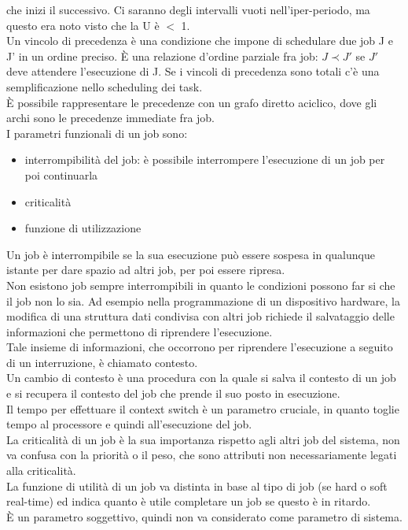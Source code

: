 \documentclass[12pt, oneside]{extbook}
\begin{document}
che inizi il successivo. Ci saranno degli intervalli vuoti nell'iper-periodo, ma questo era noto visto che la U è $<$ 1.\\ Un vincolo di precedenza è una condizione che impone di schedulare due job J e J' in un ordine preciso. È una relazione d'ordine parziale fra job: $J \prec J'$ se $J'$ deve attendere l'esecuzione di J. Se i vincoli di precedenza sono totali c'è una semplificazione nello scheduling dei task.\\ È possibile rappresentare le precedenze con un grafo diretto aciclico, dove gli archi sono le precedenze immediate fra job.\\ I parametri funzionali di un job sono:
\begin{itemize}
\item interrompibilità del job: è possibile interrompere l'esecuzione di un job per poi continuarla
\item criticalità
\item funzione di utilizzazione
\end{itemize}
Un job è interrompibile se la sua esecuzione può essere sospesa in qualunque istante per dare spazio ad altri job, per poi essere ripresa.\\ Non esistono job sempre interrompibili in quanto le condizioni possono far si che il job non lo sia. Ad esempio nella programmazione di un dispositivo hardware, la modifica di una struttura dati condivisa con altri job richiede il salvataggio delle informazioni che permettono di riprendere l'esecuzione.\\ Tale insieme di informazioni, che occorrono per riprendere l'esecuzione a seguito di un interruzione, è chiamato contesto.\\ Un cambio di contesto è una procedura con la quale si salva il contesto di un job e si recupera il contesto del job che prende il suo posto in esecuzione.\\ Il tempo per effettuare il context switch è un parametro cruciale, in quanto toglie tempo al processore e quindi all'esecuzione del job.\\ La criticalità di un job è la sua importanza rispetto agli altri job del sistema, non va confusa con la priorità o il peso, che sono attributi non necessariamente legati alla criticalità.\\ La funzione di utilità di un job va distinta in base al tipo di job (se hard o soft real-time) ed indica quanto è utile completare un job se questo è in ritardo.\\ È un parametro soggettivo, quindi non va considerato come parametro di sistema.\\
\end{document}
